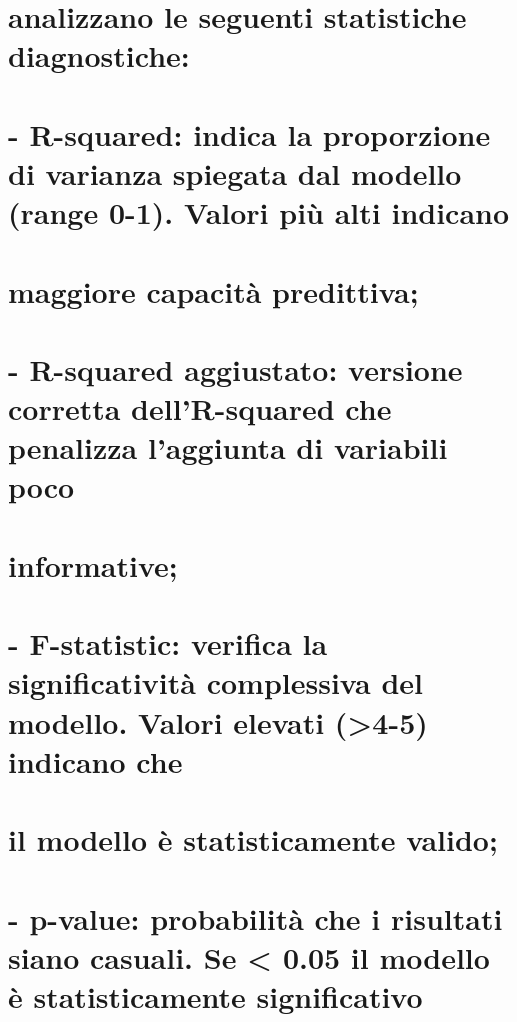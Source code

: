 \documentclass[
]{article}
\begin{document}
\section{analizzano le seguenti statistiche
diagnostiche:}\label{analizzano-le-seguenti-statistiche-diagnostiche}

\section{- R-squared: indica la proporzione di varianza spiegata dal
modello (range 0-1). Valori più alti
indicano}\label{r-squared-indica-la-proporzione-di-varianza-spiegata-dal-modello-range-0-1.-valori-piuxf9-alti-indicano}

\section{maggiore capacità
predittiva;}\label{maggiore-capacituxe0-predittiva}

\section{- R-squared aggiustato: versione corretta dell'R-squared che
penalizza l'aggiunta di variabili
poco}\label{r-squared-aggiustato-versione-corretta-dellr-squared-che-penalizza-laggiunta-di-variabili-poco}

\section{informative;}\label{informative}

\section{- F-statistic: verifica la significatività complessiva del
modello. Valori elevati (\textgreater4-5) indicano
che}\label{f-statistic-verifica-la-significativituxe0-complessiva-del-modello.-valori-elevati-4-5-indicano-che}

\section{il modello è statisticamente
valido;}\label{il-modello-uxe8-statisticamente-valido}

\section{- p-value: probabilità che i risultati siano casuali. Se
\textless{} 0.05 il modello è statisticamente
significativo}\label{p-value-probabilituxe0-che-i-risultati-siano-casuali.-se-0.05-il-modello-uxe8-statisticamente-significativo}
\end{document}

